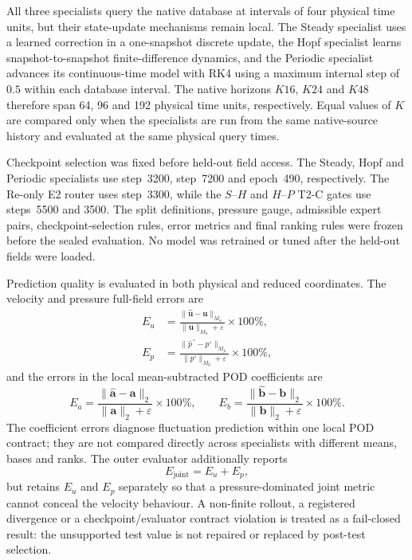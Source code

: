 All three specialists query the native database at intervals of four physical
time units, but their state-update mechanisms remain local.  The Steady
specialist uses a learned correction in a one-snapshot discrete update, the
Hopf specialist learns snapshot-to-snapshot finite-difference dynamics, and
the Periodic specialist advances its continuous-time model with RK4 using a
maximum internal step of $0.5$ within each database interval.  The native
horizons $K16$, $K24$ and $K48$ therefore span 64, 96 and 192 physical time
units, respectively.  Equal values of $K$ are compared only when the
specialists are run from the same native-source history and evaluated at the
same physical query times.

Checkpoint selection was fixed before held-out field access.  The Steady,
Hopf and Periodic specialists use step~3200, step~7200 and epoch~490,
respectively.  The Re-only E2 router uses step~3300, while the $S$--$H$ and
$H$--$P$ T2-C gates use steps~5500 and 3500.  The split definitions,
pressure gauge, admissible expert pairs, checkpoint-selection rules, error
metrics and final ranking rules were frozen before the sealed evaluation.
No model was retrained or tuned after the held-out fields were loaded.

Prediction quality is evaluated in both physical and reduced coordinates.
The velocity and pressure full-field errors are
\begin{align}
  E_u &=
  \frac{\lVert\widehat{\boldsymbol{u}}-\boldsymbol{u}\rVert_{M_u}}
       {\lVert\boldsymbol{u}\rVert_{M_u}+\varepsilon}\times100\%,
  \label{eq:centered_square_eu}\\
  E_p &=
  \frac{\lVert\widehat{p}^{\,\circ}-p^\circ\rVert_{M_p}}
       {\lVert p^\circ\rVert_{M_p}+\varepsilon}\times100\%,
  \label{eq:centered_square_ep}
\end{align}
and the errors in the local mean-subtracted POD coefficients are
\begin{equation}
  E_a=
  \frac{\lVert\widehat{\boldsymbol{a}}-\boldsymbol{a}\rVert_2}
       {\lVert\boldsymbol{a}\rVert_2+\varepsilon}\times100\%,
  \qquad
  E_b=
  \frac{\lVert\widehat{\boldsymbol{b}}-\boldsymbol{b}\rVert_2}
       {\lVert\boldsymbol{b}\rVert_2+\varepsilon}\times100\%.
  \label{eq:centered_square_modal_errors}
\end{equation}
The coefficient errors diagnose fluctuation prediction within one local POD
contract; they are not compared directly across specialists with different
means, bases and ranks.  The outer evaluator additionally reports
\begin{equation}
  E_{\mathrm{joint}}=E_u+E_p,
  \label{eq:centered_square_joint}
\end{equation}
but retains $E_u$ and $E_p$ separately so that a pressure-dominated joint
metric cannot conceal the velocity behaviour.  A non-finite rollout, a
registered divergence or a checkpoint/evaluator contract violation is
treated as a fail-closed result: the unsupported test value is not repaired
or replaced by post-test selection.

